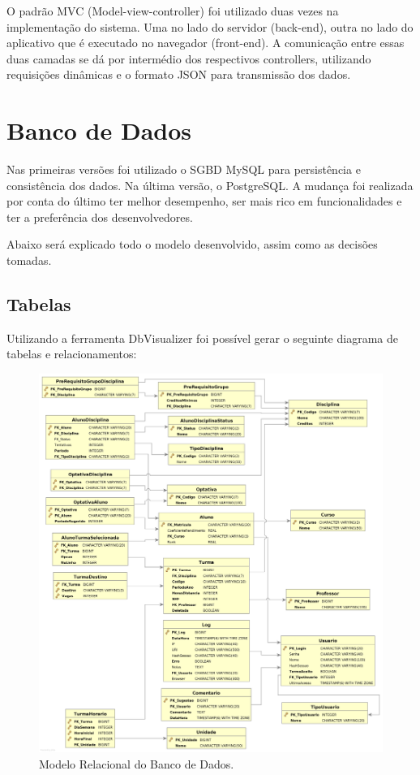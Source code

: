 \documentclass[graduacao,brazil]{ThesisPUC}
\begin{document}
O padrão MVC (Model-view-controller) foi utilizado duas vezes na implementação do sistema. Uma no lado do servidor (back-end), outra no lado do aplicativo que é executado no navegador (front-end). A comunicação entre essas duas camadas se dá por intermédio dos respectivos controllers, utilizando requisições dinâmicas e o formato JSON para transmissão dos dados.

\section{Banco de Dados}

Nas primeiras versões foi utilizado o SGBD MySQL para persistência e consistência dos dados. Na última versão, o PostgreSQL. A mudança foi realizada por conta do último ter melhor desempenho, ser mais rico em funcionalidades e ter a preferência dos desenvolvedores.

Abaixo será explicado todo o modelo desenvolvido, assim como as decisões tomadas.

\subsection{Tabelas}

Utilizando a ferramenta DbVisualizer foi possível gerar o seguinte diagrama de tabelas e relacionamentos:

\begin{figure}[H]
    \centering
    \includegraphics[width=\linewidth]{img/dbvisualizer.png}
    \caption{Modelo Relacional do Banco de Dados.}
\end{figure}
\end{document}

